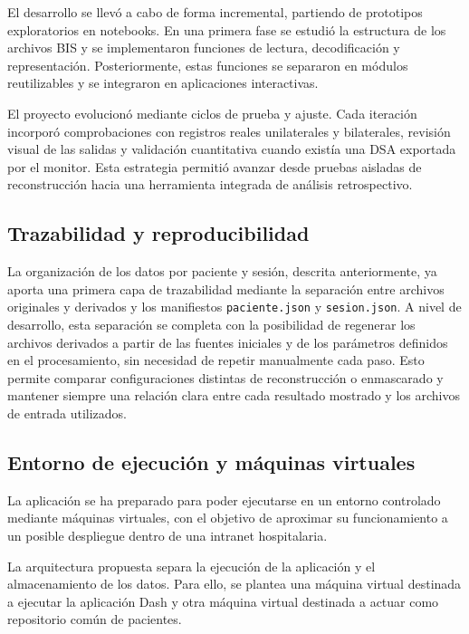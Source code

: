 \documentclass[
  spanish,
  a4paper,
  12pt,
  twoside]{memoir}
\begin{document}
El desarrollo se llevó a cabo de forma incremental, partiendo de
prototipos exploratorios en notebooks. En una primera fase se estudió la
estructura de los archivos BIS y se implementaron funciones de lectura,
decodificación y representación. Posteriormente, estas funciones se
separaron en módulos reutilizables y se integraron en aplicaciones
interactivas.

El proyecto evolucionó mediante ciclos de prueba y ajuste. Cada
iteración incorporó comprobaciones con registros reales unilaterales y
bilaterales, revisión visual de las salidas y validación cuantitativa
cuando existía una DSA exportada por el monitor. Esta estrategia
permitió avanzar desde pruebas aisladas de reconstrucción hacia una
herramienta integrada de análisis retrospectivo.

\subsection{Trazabilidad y
reproducibilidad}\label{trazabilidad-y-reproducibilidad}

La organización de los datos por paciente y sesión, descrita
anteriormente, ya aporta una primera capa de trazabilidad mediante la
separación entre archivos originales y derivados y los manifiestos
\texttt{paciente.json} y \texttt{sesion.json}. A nivel de desarrollo,
esta separación se completa con la posibilidad de regenerar los archivos
derivados a partir de las fuentes iniciales y de los parámetros
definidos en el procesamiento, sin necesidad de repetir manualmente cada
paso. Esto permite comparar configuraciones distintas de reconstrucción
o enmascarado y mantener siempre una relación clara entre cada resultado
mostrado y los archivos de entrada utilizados.

\subsection{Entorno de ejecución y máquinas
virtuales}\label{entorno-de-ejecuciuxf3n-y-muxe1quinas-virtuales}

La aplicación se ha preparado para poder ejecutarse en un entorno
controlado mediante máquinas virtuales, con el objetivo de aproximar su
funcionamiento a un posible despliegue dentro de una intranet
hospitalaria.

La arquitectura propuesta separa la ejecución de la aplicación y el
almacenamiento de los datos. Para ello, se plantea una máquina virtual
destinada a ejecutar la aplicación Dash y otra máquina virtual destinada
a actuar como repositorio común de pacientes.
\end{document}
